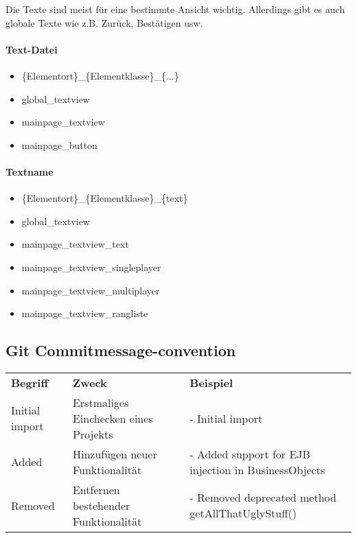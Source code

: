 Die Texte sind meist für eine bestimmte Ansicht wichtig. Allerdings gibt es auch globale Texte wie z.B. Zurück, Bestätigen usw.

\paragraph{Text-Datei}

\begin{itemize}
	\item \{Elementort\}\_\{Elementklasse\}\_\{...\}
\end{itemize}

\begin{itemize}
\item global\_textview
\item mainpage\_textview
\item mainpage\_button
\end{itemize}

\paragraph{Textname}

\begin{itemize}
	\item \{Elementort\}\_\{Elementklasse\}\_\{text\}
\end{itemize} 

\begin{itemize}
	\item global\_textview
	\item mainpage\_textview\_text
	\item mainpage\_textview\_singleplayer
	\item mainpage\_textview\_multiplayer
	\item mainpage\_textview\_rangliste
	
\end{itemize}

\subsection{Git Commitmessage-convention}

\begin{table}[H]
\begin{tabular}{|l|p{5cm}|p{9cm}|}
\hline
\textbf{Begriff} & \textbf{Zweck} & \textbf{Beispiel} \\
Initial import & Erstmaliges Einchecken eines Projekts & - Initial import \\
\hline
Added          & Hinzufügen neuer Funktionalität &  - Added support for 
														EJB injection in BusinessObjects\\
\hline
Removed        & Entfernen bestehender Funktionalität & - Removed 
														deprecated method 
														getAllThatUglyStuff() \\
\hline
\end{tabular}
\end{table}

